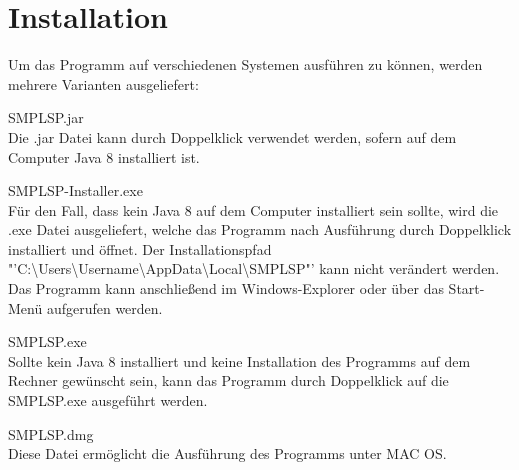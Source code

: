\section{Installation}
\label{ch:installation}
Um das Programm auf verschiedenen Systemen ausführen zu können, werden mehrere Varianten
ausgeliefert:
\begin{compactitem}
	\item SMPLSP.jar \\
	Die .jar Datei kann durch Doppelklick verwendet werden, sofern auf dem Computer Java 8 installiert ist.
	\item SMPLSP-Installer.exe \\
	Für den Fall, dass kein Java 8 auf dem Computer installiert sein sollte, wird die .exe Datei ausgeliefert, welche das Programm nach Ausführung durch Doppelklick installiert und öffnet. Der Installationspfad "'C:\textbackslash Users\textbackslash Username\textbackslash AppData\textbackslash Local\textbackslash SMPLSP"' kann nicht verändert werden. Das Programm kann anschließend im Windows-Explorer oder über das Start-Menü aufgerufen werden.
\item SMPLSP.exe \\
Sollte kein Java 8 installiert und keine Installation des Programms auf dem Rechner gewünscht sein, kann das Programm durch Doppelklick auf die SMPLSP.exe ausgeführt werden.
	\item SMPLSP.dmg \\
	Diese Datei ermöglicht die Ausführung des Programms unter MAC OS.
\end{compactitem}

\pagebreak